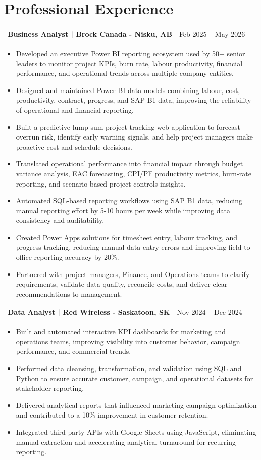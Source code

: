 \documentclass[10.5pt,letterpaper]{article}
\makeatletter
\newcommand{\resumeRow}[2]{%
  \noindent\begin{tabularx}{\linewidth}{@{}X r@{}}
    \textbf{#1} & #2 \\
  \end{tabularx}%
}
\makeatother
\begin{document}
\section{Professional Experience}
\resumeRow{Business Analyst | Brock Canada - Nisku, AB}{Feb 2025 -- May 2026}
\begin{itemize}
  \item Developed an executive Power BI reporting ecosystem used by 50+ senior leaders to monitor project KPIs, burn rate, labour productivity, financial performance, and operational trends across multiple company entities.
  \item Designed and maintained Power BI data models combining labour, cost, productivity, contract, progress, and SAP B1 data, improving the reliability of operational and financial reporting.
  \item Built a predictive lump-sum project tracking web application to forecast overrun risk, identify early warning signals, and help project managers make proactive cost and schedule decisions.
  \item Translated operational performance into financial impact through budget variance analysis, EAC forecasting, CPI/PF productivity metrics, burn-rate reporting, and scenario-based project controls insights.
  \item Automated SQL-based reporting workflows using SAP B1 data, reducing manual reporting effort by 5-10 hours per week while improving data consistency and auditability.
  \item Created Power Apps solutions for timesheet entry, labour tracking, and progress tracking, reducing manual data-entry errors and improving field-to-office reporting accuracy by 20\%.
  \item Partnered with project managers, Finance, and Operations teams to clarify requirements, validate data quality, reconcile costs, and deliver clear recommendations to management.
\end{itemize}
\resumeRow{Data Analyst | Red Wireless - Saskatoon, SK}{Nov 2024 -- Dec 2024}
\begin{itemize}
  \item Built and automated interactive KPI dashboards for marketing and operations teams, improving visibility into customer behavior, campaign performance, and commercial trends.
  \item Performed data cleansing, transformation, and validation using SQL and Python to ensure accurate customer, campaign, and operational datasets for stakeholder reporting.
  \item Delivered analytical reports that influenced marketing campaign optimization and contributed to a 10\% improvement in customer retention.
  \item Integrated third-party APIs with Google Sheets using JavaScript, eliminating manual extraction and accelerating analytical turnaround for recurring reporting.
\end{itemize}
\end{document}

